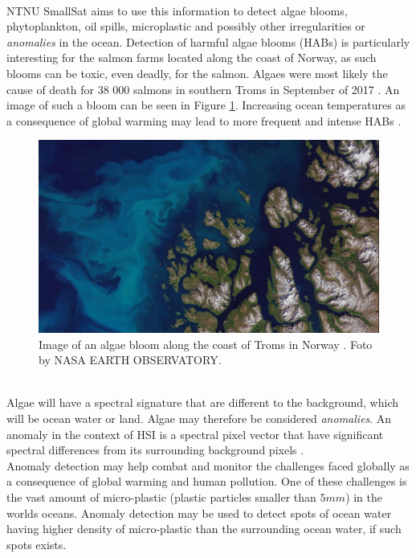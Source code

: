 \\

NTNU SmallSat aims to use this information to detect algae blooms, phytoplankton, oil spills, microplastic and possibly other irregularities or \textit{anomalies} in the ocean. Detection of harmful algae blooms (HABs) is particularly interesting for the salmon farms located along the coast of Norway, as such blooms can be toxic, even deadly, for the salmon. Algaes were most likely the cause of death for 38 000 salmons in southern Troms in September of 2017 \cite{laksedeath}. An image of such a bloom can be seen in Figure \ref{fig:algae_bloom_troms}. Increasing ocean temperatures as a consequence of global warming may lead to more frequent and intense HABs \cite{climate_change_algae_blooms}. 
\\

\begin{figure}[H]
\centering
   \includegraphics[scale=0.3]{images/algaes/algaes_northern_troms.jpg}
  \caption{ Image of an algae bloom along the coast of Troms in Norway \cite{laksedeath}. Foto by NASA EARTH OBSERVATORY. } 
  \label{fig:algae_bloom_troms}
\end{figure}
\\

Algae will have a spectral signature that are different to the background, which will be ocean water or land. Algae may therefore be considered \textit{anomalies}. An anomaly in the context of HSI is a spectral pixel vector that have significant spectral differences from its surrounding background pixels \cite{yang2015dual}.  
\\

Anomaly detection may help combat and monitor the challenges faced globally as a consequence of global warming and human pollution. One of these challenges is the vast amount of micro-plastic (plastic particles smaller than $5mm$) in the worlds oceans. Anomaly detection may be used to detect spots of ocean water having higher density of micro-plastic than the surrounding ocean water, if such spots exists.       \\



